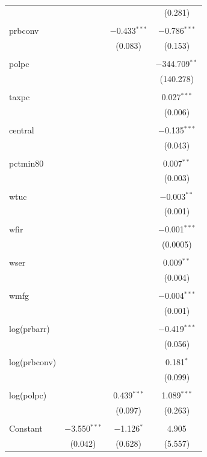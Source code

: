 \begin{table}[!htbp]
\begin{tabular}{@{\extracolsep{2pt}}lccc}
		&  &  & (0.281) \\ 
		& & & \\ 
		prbconv &  & $-$0.433$^{***}$ & $-$0.786$^{***}$ \\ 
		&  & (0.083) & (0.153) \\ 
		& & & \\ 
		polpc &  &  & $-$344.709$^{**}$ \\ 
		&  &  & (140.278) \\ 
		& & & \\ 
		taxpc &  &  & 0.027$^{***}$ \\ 
		&  &  & (0.006) \\ 
		& & & \\ 
		central &  &  & $-$0.135$^{***}$ \\ 
		&  &  & (0.043) \\ 
		& & & \\ 
		pctmin80 &  &  & 0.007$^{**}$ \\ 
		&  &  & (0.003) \\ 
		& & & \\ 
		wtuc &  &  & $-$0.003$^{**}$ \\ 
		&  &  & (0.001) \\ 
		& & & \\ 
		wfir &  &  & $-$0.001$^{***}$ \\ 
		&  &  & (0.0005) \\ 
		& & & \\ 
		wser &  &  & 0.009$^{**}$ \\ 
		&  &  & (0.004) \\ 
		& & & \\ 
		wmfg &  &  & $-$0.004$^{***}$ \\ 
		&  &  & (0.001) \\ 
		& & & \\ 
		log(prbarr) &  &  & $-$0.419$^{***}$ \\ 
		&  &  & (0.056) \\ 
		& & & \\ 
		log(prbconv) &  &  & 0.181$^{*}$ \\ 
		&  &  & (0.099) \\ 
		& & & \\ 
		log(polpc) &  & 0.439$^{***}$ & 1.089$^{***}$ \\ 
		&  & (0.097) & (0.263) \\ 
		& & & \\ 
		Constant & $-$3.550$^{***}$ & $-$1.126$^{*}$ & 4.905 \\ 
		& (0.042) & (0.628) & (5.557) \\ 

\end{tabular}
\end{table}
